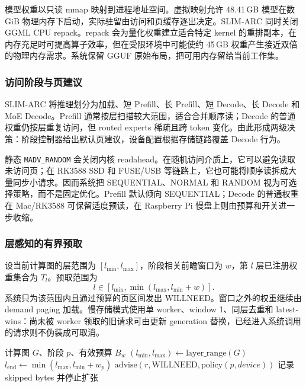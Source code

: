 模型权重以只读 mmap 映射到进程地址空间。虚拟映射允许 48.41\,GB 模型在数 GiB 物理内存下启动，实际驻留由访问和页缓存逐出决定。SLIM-ARC 同时关闭 GGML CPU repack。repack 会为量化权重建立适合特定 kernel 的重排副本，在内存充足时可提高算子效率，但在受限环境中可能使约 45\,GB 权重产生接近双倍的物理内存需求。系统保留 GGUF 原始布局，把可用内存留给当前工作集。

\subsubsection{访问阶段与页建议}

SLIM-ARC 将推理划分为加载、短 Prefill、长 Prefill、短 Decode、长 Decode 和 MoE Decode。Prefill 通常按层扫描较大范围，适合合并顺序读；Decode 的普通权重仍按层重复访问，但 routed experts 稀疏且跨 token 变化。由此形成两级决策：阶段控制器给出默认页建议，设备配置根据存储链路覆盖 Decode 行为。

静态 \texttt{MADV\_RANDOM} 会关闭内核 readahead。在随机访问介质上，它可以避免读取未访问页；在 RK3588 SSD 和 FUSE/USB 等链路上，它也可能将顺序读拆成大量同步小请求。因而系统把 SEQUENTIAL、NORMAL 和 RANDOM 视为可选择策略，而不是固定优化。Prefill 默认倾向 SEQUENTIAL；Decode 的普通权重在 Mac/RK3588 可保留适度预读，在 Raspberry Pi 慢盘上则由预算和开关进一步收缩。

\subsubsection{层感知的有界预取}

设当前计算图的层范围为 $[l_{\min},l_{\max}]$，阶段相关前瞻窗口为 $w$，第 $l$ 层已注册权重集合为 $T_l$。预取范围为
\begin{equation}
  l \in [l_{\min},\min(l_{\max},l_{\min}+w)].
\end{equation}
系统只为该范围内且通过预算的页区间发出 WILLNEED。窗口之外的权重继续由 demand paging 加载。慢存储模式使用单 worker、window 1、同层去重和 latest-wins：尚未被 worker 领取的旧请求可由更新 generation 替换，已经进入系统调用的请求则不伪装成可取消。

\begin{algorithm}[H]
  \caption{阶段感知的有界权重预取}
  \label{alg:bounded-prefetch}
  \begin{algorithmic}[1]
    \REQUIRE 计算图 $G$、阶段 $p$、有效预算 $B_w$
    \STATE $(l_{\min},l_{\max}) \gets \mathrm{layer\_range}(G)$
    \STATE $l_{\mathrm{end}} \gets \min(l_{\max},l_{\min}+w_p)$
          \STATE $\mathrm{advise}(r,\mathrm{WILLNEED},\mathrm{policy}(p,device))$
        \ELSE
          \STATE 记录 skipped bytes 并停止扩张
        \ENDIF
      \ENDFOR
    \ENDFOR
  \end{algorithmic}
\end{algorithm}

